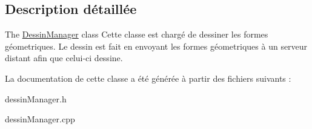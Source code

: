 \subsection{Description détaillée}
The \hyperlink{class_dessin_manager}{Dessin\+Manager} class Cette classe est chargé de dessiner les formes géometriques. Le dessin est fait en envoyant les formes géometriques à un serveur distant afin que celui-\/ci dessine. 

La documentation de cette classe a été générée à partir des fichiers suivants \+:\begin{DoxyCompactItemize}
\item 
dessin\+Manager.\+h\item 
dessin\+Manager.\+cpp\end{DoxyCompactItemize}
